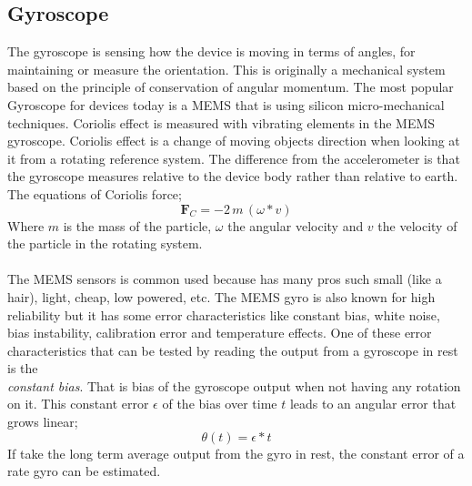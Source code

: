 \subsection{Gyroscope}\label{sec:gyroscope}
The gyroscope is sensing how the device is moving in terms of angles, for maintaining or measure the orientation. This is originally  a mechanical system based on the principle of conservation of angular momentum. The most popular Gyroscope for devices today is a MEMS that is using silicon micro-mechanical techniques. Coriolis effect is measured with vibrating elements in the MEMS gyroscope. Coriolis effect is a change of moving objects direction when looking at it from a rotating reference system. The difference from the accelerometer is that the gyroscope measures relative to the device body rather than relative to earth. The equations of Coriolis force;  
$$\boldsymbol{ F}_C = -2 \, m \, (\omega *  v)$$
Where $m$ is the mass of the particle, $\omega$ the angular velocity and $v$ the velocity of the particle in the rotating system. 
\cite[]{sensor:inertialNav} \\
\\
The MEMS sensors is common used because has many pros such small (like a hair), light, cheap, low powered, etc. The MEMS gyro is also known for high reliability but it has some error characteristics like constant bias, white noise, bias instability, calibration error and temperature effects. One of these error characteristics that can be tested by reading the output from a gyroscope in rest is the \\\textit{constant bias}. That is bias of the gyroscope output when not having any rotation on it. This constant error $\epsilon$ of the bias over time $t$ leads to an angular error that grows linear; 
$$\theta (t)= \epsilon * t $$
If take the long term average output from the gyro in rest, the constant error of a rate gyro can be estimated.  


